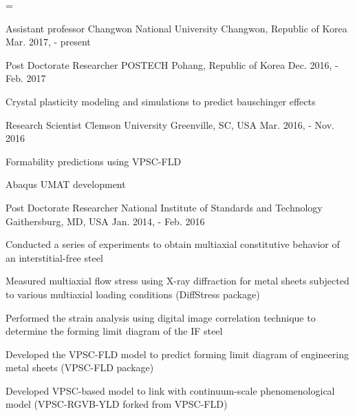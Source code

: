 \documentclass[11pt,a4paper]{awesome-cv}
\makeatletter
\let\realnormalsize=\normalsize
\def\liih@math{\ifmmode$\else\bad@math\fi}
\def\adjustnormalsize{\def\normalsize{\mathsurround=0pt \realnormalsize
 \parindent=0pt\abovedisplayskip=0pt\belowdisplayskip=0pt}%
 \def\phantompar{\csname par\endcsname}\normalsize}%
\newcommand\lthtmlvboxmathA{\adjustnormalsize\setbox\sizebox=\vbox\bgroup %
 \let\ifinner=\iffalse \let\)\liih@math }%
\newcommand\lthtmlmathtype[1]{\gdef\lthtmlmathenv{#1}}%
\newcommand\lthtmlfigureA[1]{\let\@savefreelist\@freelist
       \lthtmlmathtype{#1}\lthtmlvboxmathA}%
\makeatother
\begin{document}
{\newpage\clearpage
\lthtmlfigureA{cventries77}%
\begin{cventries}
  \cventry
  {Assistant professor} %
  {Changwon National University}
  {Changwon, Republic of Korea} %
  {Mar. 2017, - present} %
  {
  }
\par
\cventry
  {Post Doctorate Researcher} %
  {POSTECH}
  {Pohang, Republic of Korea} %
  {Dec. 2016, - Feb. 2017} %
  {
    \begin{cvitems} %
    \item {Crystal plasticity modeling and simulations to predict bauschinger effects}
    \end{cvitems}
  }
\par
\cventry
  {Research Scientist} %
  {Clemson University}
  {Greenville, SC, USA} %
  {Mar. 2016, - Nov. 2016} %
  {
    \begin{cvitems} %
    \item {Formability predictions using VPSC-FLD}
    \item {Abaqus UMAT development}
    \end{cvitems}
  }
\par
\cventry
  {Post Doctorate Researcher} %
  {National Institute of Standards and Technology} %
  {Gaithersburg, MD, USA} %
  {Jan. 2014, - Feb. 2016} %
  {
    \begin{cvitems} %
    \item {Conducted a series of experiments to obtain multiaxial constitutive behavior of an interstitial-free steel}
    \item {Measured multiaxial flow stress using X-ray diffraction for metal sheets subjected to various multiaxial loading conditions (DiffStress package)}
    \item {Performed the strain analysis using digital image correlation technique to determine the forming limit diagram of the IF steel}
    \item {Developed the VPSC-FLD model to predict forming limit diagram of engineering metal sheets (VPSC-FLD package)}
    \item {Developed VPSC-based model to link with continuum-scale phenomenological model (VPSC-RGVB-YLD forked from VPSC-FLD)}
    \end{cvitems}
}
\end{cventries}}
\end{document}
